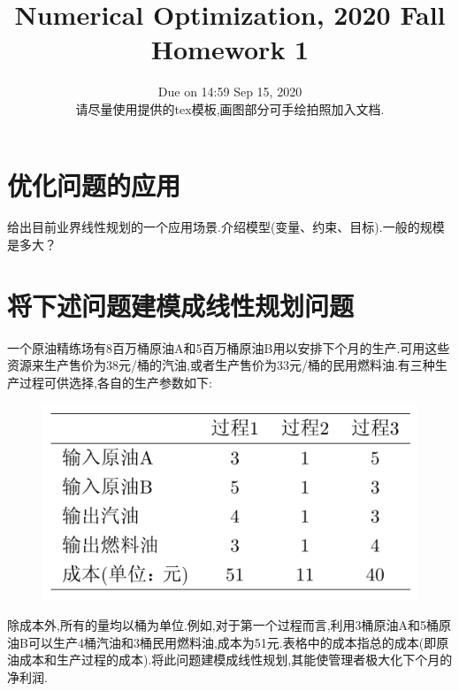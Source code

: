 \documentclass[10pt]{article}
\begin{document}
	
\title{	Numerical Optimization, 2020 Fall\\Homework 1}
\date{Due on 14:59 Sep 15, 2020\\
	请尽量使用提供的tex模板,画图部分可手绘拍照加入文档.
	}
\maketitle

\section{优化问题的应用}
给出目前业界线性规划的一个应用场景.介绍模型(变量、约束、目标).一般的规模是多大？


\section{将下述问题建模成线性规划问题} 

一个原油精练场有8百万桶原油A和5百万桶原油B用以安排下个月的生产.可用这些资源来生产售价为38元/桶的汽油,或者生产售价为33元/桶的民用燃料油.有三种生产过程可供选择,各自的生产参数如下:
\begin{figure}[ht]
	\centering
	\includegraphics[width=0.5\linewidth]{prob1.png}
	\label{fig.prob1}
\end{figure}
除成本外,所有的量均以桶为单位.例如,对于第一个过程而言,利用3桶原油A和5桶原油B可以生产4桶汽油和3桶民用燃料油,成本为51元.表格中的成本指总的成本(即原油成本和生产过程的成本).将此问题建模成线性规划,其能使管理者极大化下个月的净利润.
\end{document}
